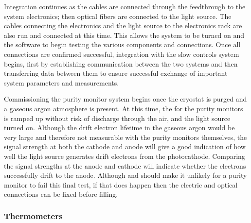 Integration %
continues as the   cables are connected through the feedthrough to the system   electronics; then optical fibers are connected to the light source.  The cables connecting the  electronics and the light source to the electronics rack %
are also run and connected at this time.  This allows the system to be turned on and the software to begin testing the various components and connections.  Once all connections are confirmed successful, integration with the slow controls system begins, first by establishing communication between the two systems and then transferring data between them to ensure successful exchange of important system parameters and measurements.  

Commissioning the purity monitor system %
begins once the cryostat is purged and a gaseous argon atmosphere is present.  At this time, the  for the purity monitors %
  is ramped up without risk of discharge through the air, and the light source turned on.  Although the drift electron lifetime in the gaseous argon would be very large and therefore not %
  measurable with the purity monitors themselves, the signal strength at both the cathode and anode will %
  give a good indication of how well the light source generates drift electrons from the photocathode.  Comparing the signal strengths at the anode and cathode will indicate whether the electrons successfully drift to the anode.
  Although  and  should make it unlikely for a purity monitor to fail this final test, if that does happen then the electric and optical connections can be fixed before filling.

\subsubsection{Thermometers}
\label{sec:fdgen-slow-cryo-install-th}

